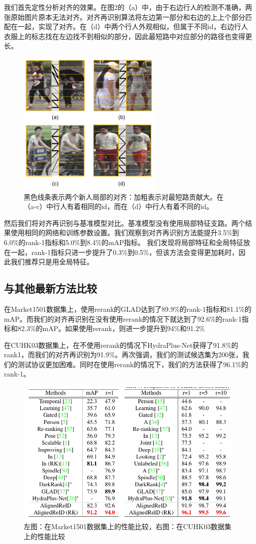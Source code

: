 我们首先定性分析对齐的效果。在图2的（a）中，由于右边行人的检测不准确，两张原始图片原本无法对齐。对齐再识别算法将左边第一部分和右边的上上个部分匹配在一起，实现了对齐。在（d）中两个行人外观相似，但属于不同id，右边行人衣服上的标志找在左边找不到相似的部分，因此最短路中对应部分的路径也变得更长。

\begin{figure}[!htbp]
\centering
\includegraphics[width=.35\linewidth,keepaspectratio]{data/waiwenfanyi/fig2.png}
\caption{黑色线条表示两个新人局部的对齐：加粗表示对最短路贡献大。在（a-c）中行人有着相同的id，而在（d）中行人有着不同的id。}
\label{figure:fig2}
\end{figure}

然后我们将对齐再识别与基准模型对比。基准模型没有使用局部特征支路。两个结果使用相同的网络和训练参数设置。我们观察到对齐再识别方法能提升3.5\%到6.0\%的rank-1指标和5.0\%到8.4\%的mAP指标。
我们发现将局部特征和全局特征放在一起，rank-1指标只进一步提升了0.3\%到0.5\%，但该方法会变得更加耗时，因此我们推荐只是用全局特征。

\subsection{与其他最新方法比较}

在Market1501数据集上，使用rerank的GLAD达到了89.9\%的rank-1指标和81.1\%的mAP。而我们的对齐再识别在没有使用rerank的情况下就达到了92.6\%的rank-1指标和82.3\%的mAP。如果使用rerank，则进一步提升到94\%和91.2\%

在CUHK03数据集上，在不使用rerank的情况下HydraPlus-Net获得了91.8\%的rank1，而我们的对齐再识别为91.9\%。再次强调，我们的测试候选集为200张，我们的测试协议更加困难。同时在使用rerank的情况下，我们的方法获得了96.1\%的rank-1。

\begin{figure}[!htbp]
  \centering
  \includegraphics[width=.85\linewidth,keepaspectratio]{data/waiwenfanyi/compare.png}
  \caption{左图：在Market1501数据集上的性能比较，右图：在CUHK03数据集上的性能比较}
  \label{figure:compare}
\end{figure}

